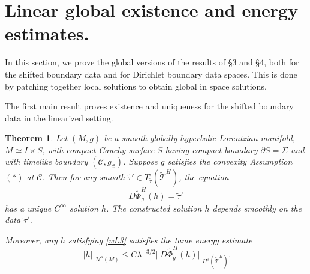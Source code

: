 \documentclass[10pt]{amsart}
\newcommand{\Si}{\Sigma}
\renewcommand{\l}{\lambda}
\newcommand{\cC}{{\mathcal C}}
\newcommand{\cT}{{\mathcal T}}
\newcommand{\cN}{{\mathcal N}}
\newcommand{\be}{\begin{equation}}
\newcommand{\ee}{\end{equation}}
\newcommand{\p}{\partial}
\newcommand{\<}{\langle}
\renewcommand{\>}{\rangle}
\newcommand{\w}{\widetilde}
\theoremstyle{plain}
\newtheorem{theorem}[lemma]{Theorem}
\theoremstyle{remark}
\theoremstyle{definition}
\numberwithin{equation}{section}
\begin{document}
 
 \section{Linear global existence and energy estimates.}
 
  In this section, we prove the global versions of the results of \S 3 and \S 4, both for the shifted boundary data and for Dirichlet boundary data spaces. 
This is done by patching together local solutions to obtain global in space solutions. 

  The first main result proves existence and uniqueness for the shifted boundary data in the linearized setting. 

\begin{theorem}\label{modglobexist}
Let $(M, g)$ be a smooth globally hyperbolic Lorentzian manifold, $M \simeq I \times S$, with compact Cauchy surface $S$ having compact boundary 
$\p S = \Si$ and with timelike boundary $(\cC, g_{\cC})$. Suppose $g$ satisfies the convexity Assumption $(*)$ at $\cC$. Then for any smooth 
$\w \tau' \in T_{\w \tau}(\w \cT^H)$, the equation 
\be \label{wL3}
D\w \Phi_g^H(h) = \w \tau'
\ee
has a unique $C^{\infty}$ solution $h$. The constructed solution $h$ depends smoothly on the data $\w \tau'$. 

Moreover, any $h$ satisfying \eqref{wL3} satisfies the tame energy estimate 
\be \label{Eest2}
||h||_{\cN^s(M)}  \leq C\l^{-3/2} ||D\w \Phi_g^H(h)||_{H^s(\w \cT^H)}. 
\ee
\end{theorem} 
 
\end{document}
